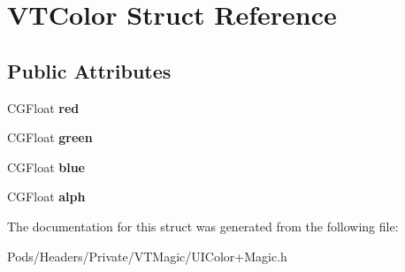 \hypertarget{struct_v_t_color}{}\section{V\+T\+Color Struct Reference}
\label{struct_v_t_color}
\subsection*{Public Attributes}
\begin{DoxyCompactItemize}
\item 
\mbox{\label{struct_v_t_color_a0af4c873d34d7d98c9d578a11ce7e5d2}} 
C\+G\+Float {\bfseries red}
\item 
\mbox{\label{struct_v_t_color_aeafcdae9a627ccf4b43b63f005850d3d}} 
C\+G\+Float {\bfseries green}
\item 
\mbox{\label{struct_v_t_color_aaf3a6e05973f9beca271d7a45e3b5326}} 
C\+G\+Float {\bfseries blue}
\item 
\mbox{\label{struct_v_t_color_a23920e9042f3b833b7d96a17009300c3}} 
C\+G\+Float {\bfseries alph}
\end{DoxyCompactItemize}


The documentation for this struct was generated from the following file\+:\begin{DoxyCompactItemize}
\item 
Pods/\+Headers/\+Private/\+V\+T\+Magic/U\+I\+Color+\+Magic.\+h\end{DoxyCompactItemize}
